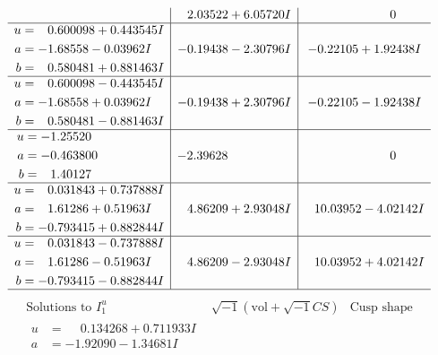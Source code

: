 \documentclass[1p]{elsarticle_modified}
\theoremstyle{definition}
\newcommand{\I}{\sqrt{-1}}
\begin{document}
$$\begin{array}{c|c|c}
 & \phantom{-}2.03522 + 6.05720 I & \phantom{-0.000000 } 0 \\ \hline\begin{aligned}
u &= \phantom{-}0.600098 + 0.443545 I \\
a &= -1.68558 - 0.03962 I \\
b &= \phantom{-}0.580481 + 0.881463 I\end{aligned}
 & -0.19438 - 2.30796 I & -0.22105 + 1.92438 I \\ \hline\begin{aligned}
u &= \phantom{-}0.600098 - 0.443545 I \\
a &= -1.68558 + 0.03962 I \\
b &= \phantom{-}0.580481 - 0.881463 I\end{aligned}
 & -0.19438 + 2.30796 I & -0.22105 - 1.92438 I \\ \hline\begin{aligned}
u &= -1.25520\phantom{ +0.000000I} \\
a &= -0.463800\phantom{ +0.000000I} \\
b &= \phantom{-}1.40127\phantom{ +0.000000I}\end{aligned}
 & -2.39628\phantom{ +0.000000I} & \phantom{-0.000000 } 0 \\ \hline\begin{aligned}
u &= \phantom{-}0.031843 + 0.737888 I \\
a &= \phantom{-}1.61286 + 0.51963 I \\
b &= -0.793415 + 0.882844 I\end{aligned}
 & \phantom{-}4.86209 + 2.93048 I & \phantom{-}10.03952 - 4.02142 I \\ \hline\begin{aligned}
u &= \phantom{-}0.031843 - 0.737888 I \\
a &= \phantom{-}1.61286 - 0.51963 I \\
b &= -0.793415 - 0.882844 I\end{aligned}
 & \phantom{-}4.86209 - 2.93048 I & \phantom{-}10.03952 + 4.02142 I\\
 \hline 
 \end{array}$$\newpage$$\begin{array}{c|c|c}  
\text{Solutions to }I^u_{1}& \I (\text{vol} + \sqrt{-1}CS) & \text{Cusp shape}\\
 \hline 
\begin{aligned}
u &= \phantom{-}0.134268 + 0.711933 I \\
a &= -1.92090 - 1.34681 I \\

\end{aligned}
\end{array}$$
\end{document}
